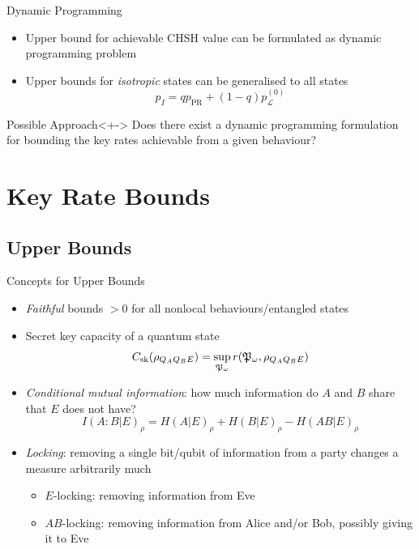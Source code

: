 \documentclass[xcolor=dvipsnames]{beamer}
\newcommand{\?}{\mathrel{?}} %
\newcommand{\Ls}{\mathcal{L}}
\newcommand{\PR}{\mathrm{PR}}
\newcommand{\sk}{\rm sk}
\begin{document}
\begin{frame}{Dynamic Programming}
  \begin{itemize}[<+->]
    \item Upper bound for achievable CHSH value can be formulated as dynamic programming problem
    \item Upper bounds for \emph{isotropic} states can be generalised to all states
      \[ p_I = qp_{\PR} + (1-q)p_{\Ls}^{(0)} \]
  \end{itemize}
  \begin{block}{Possible Approach}<+->
    Does there exist a dynamic programming formulation for bounding the key rates achievable from a given behaviour?
  \end{block}
\end{frame}

\section{Key Rate Bounds}

\subsection{Upper Bounds}

\begin{frame}{Concepts for Upper Bounds}
  \begin{itemize}[<+->]
    \item \emph{Faithful} bounds \(> 0\) for all nonlocal behaviours/entangled states
    \item Secret key capacity of a quantum state
      \[ C_{\sk}(\rho_{Q_A Q_B E}) = \sup_{\mathfrak{P}_{\omega}} 
      r(\mathfrak{P}_{\omega}, \rho_{Q_A Q_B E}) \]
    \item \emph{Conditional mutual information}: how much information do \(A\) and \(B\) share that \(E\) does not have?
        \[ I{(A:B|E)}_{\rho} = H{(A|E)}_{\rho} + H{(B|E)}_{\rho} - H{(AB|E)}_{\rho} \]
    \item \emph{Locking}: removing a single bit/qubit of information from a party changes a measure arbitrarily much
      \begin{itemize}
        \item \(E\)-locking: removing information from Eve
        \item \(AB\)-locking: removing information from Alice and/or Bob, possibly giving it to Eve
      \end{itemize}
  \end{itemize}
\end{frame}
\end{document}
